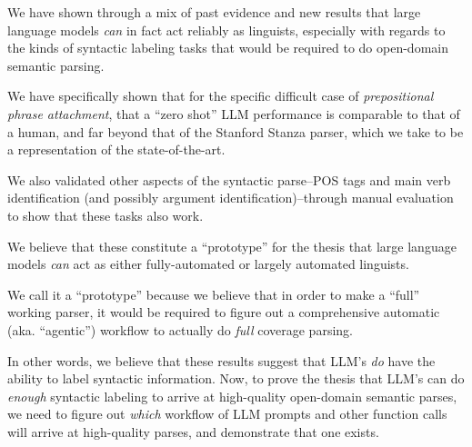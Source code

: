 \label{sec:conclusion}
We have shown through a mix of past evidence and new results that large language models {\em can} in fact act reliably as linguists, especially with regards to the kinds of syntactic labeling tasks that would be required to do open-domain semantic parsing.

We have specifically shown that for the specific difficult case of {\em prepositional phrase attachment}, that a ``zero shot'' LLM performance is comparable to that of a human, and far beyond that of the Stanford Stanza parser, which we take to be a representation of the state-of-the-art.

We also validated other aspects of the syntactic parse--POS tags and main verb identification (and possibly argument identification)--through manual evaluation to show that these tasks also work.

We believe that these constitute a ``prototype'' for the thesis that large language models {\em can} act as either fully-automated or largely automated linguists.

We call it a ``prototype'' because we believe that in order to make a ``full'' working parser, it would be required to figure out a comprehensive automatic (aka. ``agentic'') workflow to actually do {\em full} coverage parsing.

In other words, we believe that these results suggest that LLM's {\em do} have the ability to label syntactic information. Now, to prove the thesis that LLM's can do {\em enough} syntactic labeling to arrive at high-quality open-domain semantic parses, we need to figure out {\em which} workflow of LLM prompts and other function calls will arrive at high-quality parses, and demonstrate that one exists.